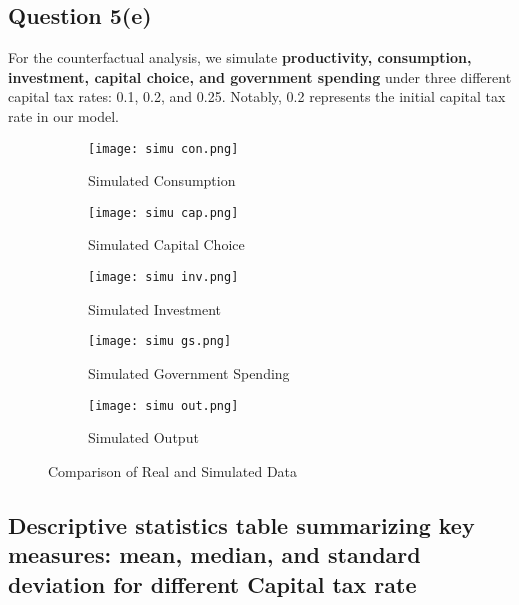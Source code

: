 \documentclass{article}
\begin{document}
\subsection*{Question 5(e)}
For the counterfactual analysis, we simulate \textbf{productivity, consumption, investment, capital choice, and government spending} under three different capital tax rates: 0.1, 0.2, and 0.25. Notably, 0.2 represents the initial capital tax rate in our model.

\begin{figure}[H]
    \centering
    \begin{subfigure}{0.48\textwidth}
        \centering
        \texttt{[image: simu con.png]}
        \caption{Simulated Consumption}
        \label{fig:image1}
    \end{subfigure}
    \hfill
    \begin{subfigure}{0.48\textwidth}
        \centering
        \texttt{[image: simu cap.png]}
        \caption{Simulated Capital Choice}
        \label{fig:image2}
    \end{subfigure}

    \begin{subfigure}{0.48\textwidth}
        \centering
        \texttt{[image: simu inv.png]}
        \caption{Simulated Investment}
        \label{fig:image3}
    \end{subfigure}
    \hfill
    \begin{subfigure}{0.48\textwidth}
        \centering
        \texttt{[image: simu gs.png]}
        \caption{Simulated Government Spending}
        \label{fig:image4}
    \end{subfigure}

    \begin{subfigure}{0.6\textwidth}
        \centering
        \texttt{[image: simu out.png]}
        \caption{Simulated Output}
        \label{fig:image5}
    \end{subfigure}

    \caption{Comparison of Real and Simulated Data}
    \label{fig:comparison}
\end{figure}

\subsection*{Descriptive statistics table summarizing key measures: mean, median, and standard deviation for different Capital tax rate}
\end{document}
